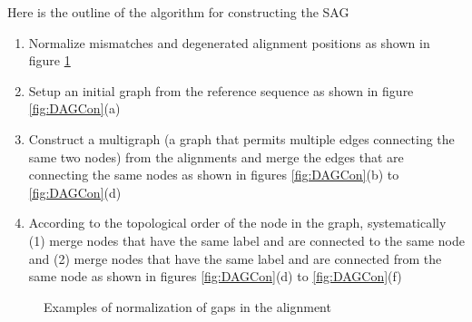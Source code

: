 \documentclass[11pt]{article}
\begin{document}
Here is the outline of the algorithm for constructing the SAG
\begin{enumerate}
\item Normalize mismatches and degenerated alignment positions as shown in figure \ref{fig:shift_gap}
\item Setup an initial graph from the reference sequence as shown in figure \ref{fig:DAGCon}(a) 
\item Construct a multigraph (a graph that permits multiple edges connecting the same two nodes) from the alignments and merge the edges that are connecting the same nodes as shown in figures \ref{fig:DAGCon}(b) to \ref{fig:DAGCon}(d)
\item According to the topological order of the node in the graph, systematically (1) merge nodes that have the same label and are connected to the same node and (2) merge nodes that have the same label and are connected from the same node as shown in figures \ref{fig:DAGCon}(d) to \ref{fig:DAGCon}(f)  
\end{enumerate}


\begin{figure}[h]


\caption{Examples of normalization of gaps in the alignment}
\label{fig:shift_gap}
\end{figure}
\end{document}
